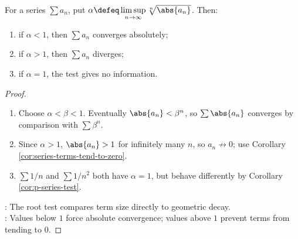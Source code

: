 \begin{theorem} \label{thm:root-test} \\
For a series $\sum a_n$, put $\alpha\defeq\limsup\limits_{n\to\infty}\sqrt[n]{\abs{a_n}}$. Then:
\begin{enumerate}[label=(\roman*)]
\setlength{\itemsep}{0pt}
\item if $\alpha<1$, then $\sum a_n$ converges absolutely;
\item if $\alpha>1$, then $\sum a_n$ diverges;
\item if $\alpha=1$, the test gives no information.
\end{enumerate}
\begin{proof}
\begin{enumerate}[label=(\roman*)]
\setlength{\itemsep}{0pt}
\item Choose $\alpha<\beta<1$. Eventually $\abs{a_n}<\beta^n$, so $\sum\abs{a_n}$ converges by comparison with $\sum\beta^n$.
\item Since $\alpha>1$, $\abs{a_n}>1$ for infinitely many $n$, so $a_n\not\to0$; use Corollary \ref{cor:series-terms-tend-to-zero}.
\item $\sum1/n$ and $\sum1/n^2$ both have $\alpha=1$, but behave differently by Corollary \ref{cor:p-series-test}.
\end{enumerate}
: The root test compares term size directly to geometric decay.\\
: Values below $1$ force absolute convergence; values above $1$ prevent terms from tending to $0$.
\end{proof}
\end{theorem}

